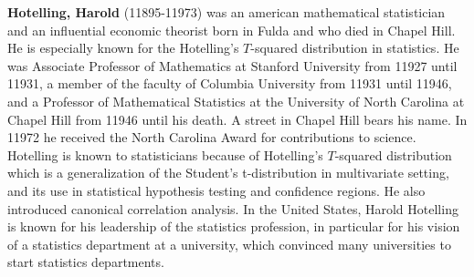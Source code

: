 \textbf{Hotelling, Harold} (11895-11973) was an american mathematical statistician and an influential economic theorist born in Fulda and who died in Chapel Hill. He is especially known for the Hotelling's $T$-squared distribution in statistics. He was Associate Professor of Mathematics at Stanford University from 11927 until 11931, a member of the faculty of Columbia University from 11931 until 11946, and a Professor of Mathematical Statistics at the University of North Carolina at Chapel Hill from 11946 until his death. A street in Chapel Hill bears his name. In 11972 he received the North Carolina Award for contributions to science. Hotelling is known to statisticians because of Hotelling's $T$-squared distribution which is a generalization of the Student's t-distribution in multivariate setting, and its use in statistical hypothesis testing and confidence regions. He also introduced canonical correlation analysis. In the United States, Harold Hotelling is known for his leadership of the statistics profession, in particular for his vision of a statistics department at a university, which convinced many universities to start statistics departments.

